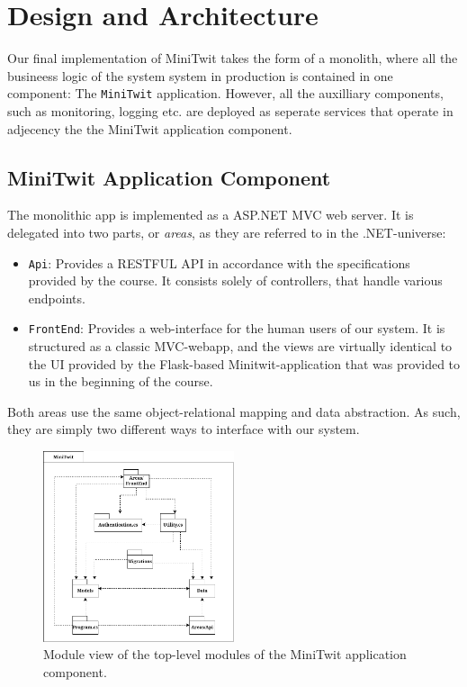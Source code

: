 \section{Design and Architecture}\label{sec:design-arch}

Our final implementation of MiniTwit takes the form of a monolith, where all the busineess logic of the system system in production is contained in one component: The \texttt{MiniTwit} application.
However, all the auxilliary components, such as monitoring, logging etc. are deployed as seperate services that operate in adjecency the the MiniTwit application component.


\subsection{MiniTwit Application Component}

The monolithic app is implemented as a ASP.NET MVC web server. It is delegated into two parts, or \textit{areas}, as they are referred to in the .NET-universe:

\begin{itemize}
	\item \texttt{Api}: Provides a RESTFUL API in accordance with the specifications provided by the course. It consists solely of controllers, that handle various endpoints.
	\item \texttt{FrontEnd}: Provides a web-interface for the human users of our system. It is structured as a classic MVC-webapp, and the views are virtually identical to the UI provided by the Flask-based Minitwit-application that was provided to us in the beginning of the course.
\end{itemize}

Both areas use the same object-relational mapping and data abstraction. As such, they are simply two different ways to interface with our system.

\begin{figure}
	\begin{center}
		\includegraphics[width=0.50\textwidth]{img/module1.pdf}
	\end{center}
	\caption{Module view of the top-level modules of the MiniTwit application component.}\label{fig:module1}
\end{figure}




